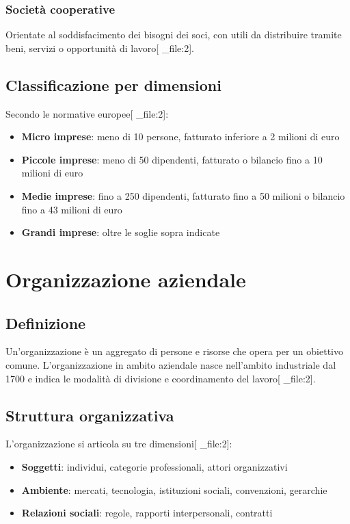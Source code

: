 \documentclass[12pt,a4paper]{article}
\begin{document}
\subsubsection{Società cooperative}
Orientate al soddisfacimento dei bisogni dei soci, con utili da distribuire tramite beni, servizi o opportunità di lavoro[ _file:2].

\subsection{Classificazione per dimensioni}
Secondo le normative europee[ _file:2]:

\begin{itemize}
    \item \textbf{Micro imprese}: meno di 10 persone, fatturato inferiore a 2 milioni di euro
    \item \textbf{Piccole imprese}: meno di 50 dipendenti, fatturato o bilancio fino a 10 milioni di euro
    \item \textbf{Medie imprese}: fino a 250 dipendenti, fatturato fino a 50 milioni o bilancio fino a 43 milioni di euro
    \item \textbf{Grandi imprese}: oltre le soglie sopra indicate
\end{itemize}

\section{Organizzazione aziendale}

\subsection{Definizione}
Un'organizzazione è un aggregato di persone e risorse che opera per un obiettivo comune. L'organizzazione in ambito aziendale nasce nell'ambito industriale dal 1700 e indica le modalità di divisione e coordinamento del lavoro[ _file:2].

\subsection{Struttura organizzativa}
L'organizzazione si articola su tre dimensioni[ _file:2]:

\begin{itemize}
    \item \textbf{Soggetti}: individui, categorie professionali, attori organizzativi
    \item \textbf{Ambiente}: mercati, tecnologia, istituzioni sociali, convenzioni, gerarchie
    \item \textbf{Relazioni sociali}: regole, rapporti interpersonali, contratti
\end{itemize}
\end{document}
